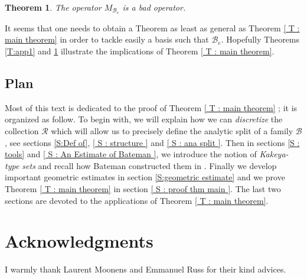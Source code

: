 \documentclass{article}
\newtheorem{thm}{Theorem}
\begin{document}
\begin{thm}\label{T :app2}
The operator $M_{\mathcal{B}_e}$ is a bad operator.
\end{thm}

It seems that one needs to obtain a Theorem as least as general as Theorem \ref{ T : main theorem} in order to tackle easily a basis such that $\mathcal{B}_e$. Hopefully Theorems \ref{T:app1} and \ref{T :app2} illustrate the implications of Theorem \ref{ T : main theorem}.


\subsection*{Plan}

Most of this text is dedicated to the proof of Theorem \ref{ T : main theorem} ; it is organized as follow. To begin with, we will explain how we can \textit{discretize} the collection $\mathcal{R}$ which will allow us to precisely define the analytic split of a family $\mathcal{B}$, see sections \ref{S:Def of}, \ref{ S : structure } and \ref{ S : ana split }. Then in sections \ref{S : tools} and \ref{ S : An Estimate of Bateman }, we introduce the notion of \textit{Kakeya-type sets} and recall how Bateman constructed them in \cite{BATEMAN}. Finally we develop important geometric estimates in section \ref{S:geometric estimate} and we prove Theorem \ref{ T : main theorem} in section \ref{ S : proof thm main }. The last two sections are devoted to the applications of Theorem \ref{ T : main theorem}.















\section*{Acknowledgments}

I warmly thank Laurent Moonens and Emmanuel Russ for their kind advices. 
\end{document}
